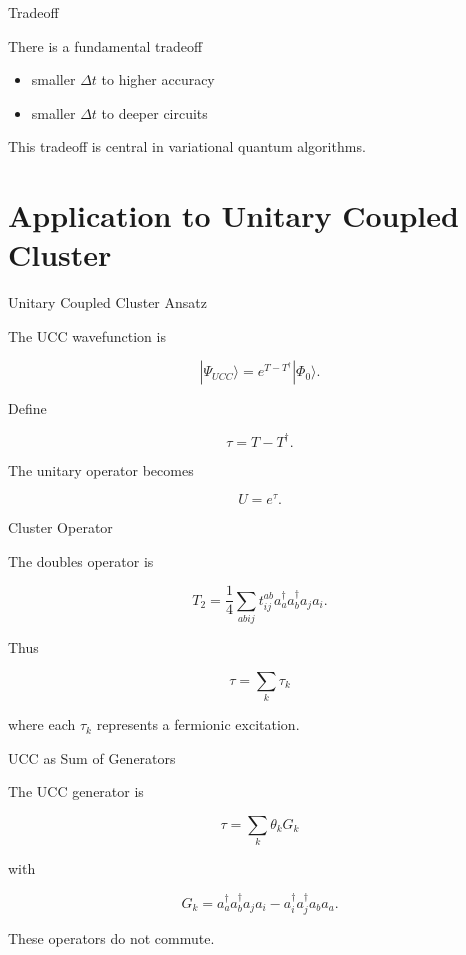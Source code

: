 \documentclass{beamer}
\begin{document}
\begin{frame}{Tradeoff}

There is a fundamental tradeoff

\begin{itemize}
\item smaller $\Delta t$ to  higher accuracy
\item smaller $\Delta t$ to  deeper circuits
\end{itemize}

This tradeoff is central in variational quantum algorithms.

\end{frame}

\section{Application to Unitary Coupled Cluster}

\begin{frame}{Unitary Coupled Cluster Ansatz}

The UCC wavefunction is

\[
|\Psi_{UCC}\rangle =
e^{T-T^\dagger}|\Phi_0\rangle .
\]

Define

\[
\tau = T-T^\dagger .
\]

The unitary operator becomes

\[
U = e^{\tau}.
\]

\end{frame}

\begin{frame}{Cluster Operator}

The doubles operator is

\[
T_2 =
\frac{1}{4}
\sum_{abij}
t_{ij}^{ab}
a_a^\dagger a_b^\dagger a_j a_i .
\]

Thus

\[
\tau =
\sum_k \tau_k
\]

where each $\tau_k$ represents a fermionic excitation.

\end{frame}

\begin{frame}{UCC as Sum of Generators}

The UCC generator is

\[
\tau =
\sum_k \theta_k G_k
\]

with

\[
G_k =
a_a^\dagger a_b^\dagger a_j a_i
-
a_i^\dagger a_j^\dagger a_b a_a .
\]

These operators do not commute.

\end{frame}
\end{document}
